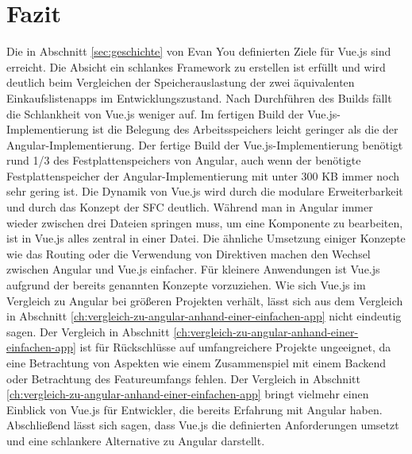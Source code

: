 

\chapter{Fazit}
Die in Abschnitt \ref{sec:geschichte} von Evan You definierten Ziele für Vue.js sind erreicht.
Die Absicht ein schlankes Framework zu erstellen ist erfüllt und wird deutlich beim Vergleichen der Speicherauslastung
der zwei äquivalenten Einkaufslistenapps im Entwicklungszustand.
Nach Durchführen des Builds fällt die Schlankheit von Vue.js weniger auf.
Im fertigen Build der Vue.js-Implementierung ist die Belegung des Arbeitsspeichers leicht geringer als die der Angular-Implementierung.
Der fertige Build der Vue.js-Implementierung benötigt rund 1/3 des Festplattenspeichers von Angular,
auch wenn der benötigte Festplattenspeicher der Angular-Implementierung mit unter 300 KB immer noch sehr gering ist.
Die Dynamik von Vue.js wird durch die modulare Erweiterbarkeit und durch das
Konzept der SFC deutlich.
Während man in Angular immer wieder zwischen drei Dateien springen muss, um eine Komponente zu bearbeiten,
ist in Vue.js alles zentral in einer Datei.
Die ähnliche Umsetzung einiger Konzepte wie das Routing oder die Verwendung von Direktiven machen
den Wechsel zwischen Angular und Vue.js einfacher.
Für kleinere Anwendungen ist Vue.js aufgrund der bereits genannten Konzepte vorzuziehen.
Wie sich Vue.js im Vergleich zu Angular bei größeren Projekten verhält, lässt sich aus dem Vergleich
in Abschnitt \ref{ch:vergleich-zu-angular-anhand-einer-einfachen-app} nicht eindeutig sagen.
Der Vergleich in Abschnitt \ref{ch:vergleich-zu-angular-anhand-einer-einfachen-app} ist für Rückschlüsse
auf umfangreichere Projekte ungeeignet, da eine Betrachtung von Aspekten wie einem Zusammenspiel mit einem Backend
oder Betrachtung des Featureumfangs fehlen.
Der Vergleich in Abschnitt \ref{ch:vergleich-zu-angular-anhand-einer-einfachen-app} bringt vielmehr einen
Einblick von Vue.js für Entwickler, die bereits Erfahrung mit Angular haben.
Abschließend lässt sich sagen, dass Vue.js die definierten
Anforderungen umsetzt und eine schlankere Alternative zu Angular
darstellt.
